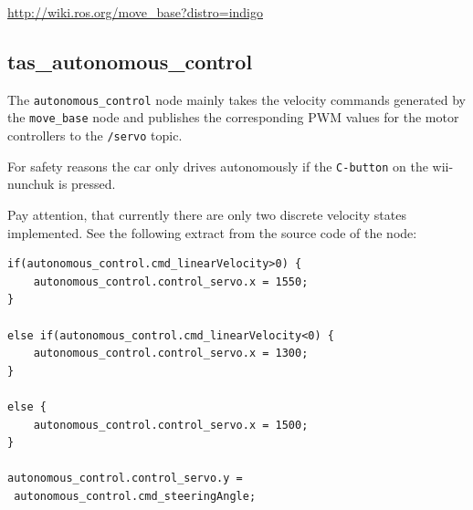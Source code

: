 \hyperref[http://wiki.ros.org/move_base?distro=indigo]{http://wiki.ros.org/move\_base?distro=indigo}


\subsection{tas\_autonomous\_control}
\label{sec:tas_package_autonomous_control}
The  \texttt{autonomous\_control} node mainly takes the velocity commands generated by the \texttt{move\_base} node and publishes the corresponding PWM values for the motor controllers to the \texttt{/servo} topic.

For safety reasons the car only drives autonomously if the \texttt{C-button} on the wii-nunchuk is pressed.

Pay attention, that currently there are only two discrete velocity states implemented. See the following extract from the source code of the node:

\begin{lstlisting}
if(autonomous_control.cmd_linearVelocity>0) {
	autonomous_control.control_servo.x = 1550;
}

else if(autonomous_control.cmd_linearVelocity<0) {
	autonomous_control.control_servo.x = 1300;
}

else {
	autonomous_control.control_servo.x = 1500;
}

autonomous_control.control_servo.y = 
 autonomous_control.cmd_steeringAngle;
\end{lstlisting}






